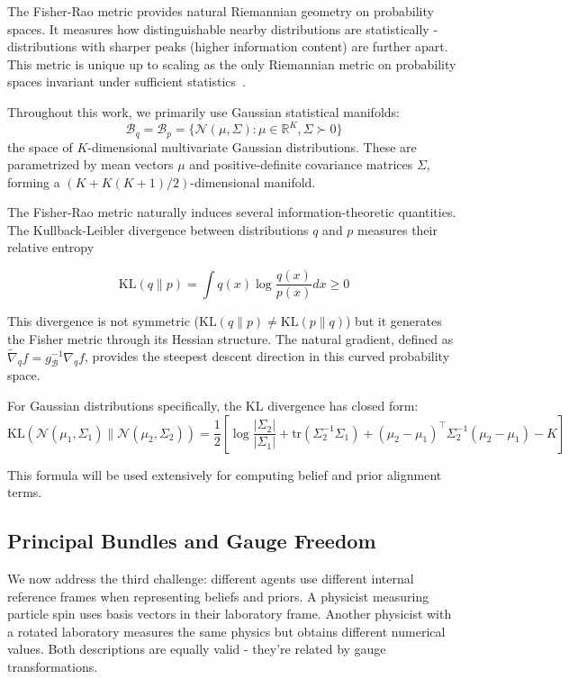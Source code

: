 \documentclass[11pt]{article}
\begin{document}
The Fisher-Rao metric provides natural Riemannian geometry on probability spaces. It measures how distinguishable nearby distributions are statistically - distributions with sharper peaks (higher information content) are further apart. This metric is unique up to scaling as the only Riemannian metric on probability spaces invariant under sufficient statistics~\cite{Cencov1982}.

Throughout this work, we primarily use Gaussian statistical manifolds:
\begin{equation}
\mathcal{B}_q = \mathcal{B}_p = \{\mathcal{N}(\mu, \Sigma) : \mu \in \mathbb{R}^K, \Sigma \succ 0\}
\end{equation}
the space of $K$-dimensional multivariate Gaussian distributions. These are parametrized by mean vectors $\mu$ and positive-definite covariance matrices $\Sigma$, forming a $(K + K(K+1)/2)$-dimensional manifold.

The Fisher-Rao metric naturally induces several information-theoretic quantities. The Kullback-Leibler divergence between distributions $q$ and $p$ measures their relative entropy

\begin{equation}
\mathrm{KL}(q \| p) = \int q(x) \log\frac{q(x)}{p(x)} dx \geq 0
\end{equation}

This divergence is not symmetric ($\mathrm{KL}(q \| p) \neq \mathrm{KL}(p \| q)$) but it generates the Fisher metric through its Hessian structure. The natural gradient, defined as $\tilde{\nabla}_q f = g^{-1}_{\mathcal{B}} \nabla_q f$, provides the steepest descent direction in this curved probability space.

For Gaussian distributions specifically, the KL divergence has closed form:
\begin{equation}
\mathrm{KL}(\mathcal{N}(\mu_1, \Sigma_1) \| \mathcal{N}(\mu_2, \Sigma_2)) = \frac{1}{2}\left[\log\frac{|\Sigma_2|}{|\Sigma_1|} + \mathrm{tr}(\Sigma_2^{-1}\Sigma_1) + (\mu_2 - \mu_1)^\top\Sigma_2^{-1}(\mu_2 - \mu_1) - K\right]
\end{equation}

This formula will be used extensively for computing belief and prior alignment terms.

\subsection{Principal Bundles and Gauge Freedom}

We now address the third challenge: different agents use different internal reference frames when representing beliefs and priors. A physicist measuring particle spin uses basis vectors in their laboratory frame. Another physicist with a rotated laboratory measures the same physics but obtains different numerical values. Both descriptions are equally valid - they're related by gauge transformations.
\end{document}
